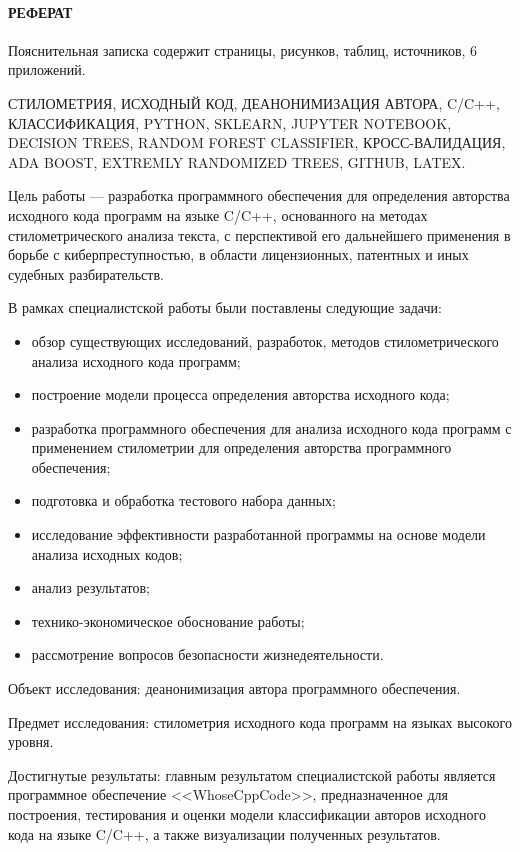 
\newpage
{}
\paragraph{\hfill РЕФЕРАТ \hfill}
Пояснительная записка содержит  страницы,  рисунков,  таблиц,  источников,
6 приложений.


СТИЛОМЕТРИЯ, ИСХОДНЫЙ КОД, ДЕАНОНИМИЗАЦИЯ АВТОРА, C/C++, КЛАССИФИКАЦИЯ, PYTHON, SKLEARN, JUPYTER NOTEBOOK, DECISION
TREES, RANDOM FOREST CLASSIFIER, КРОСС-ВАЛИДАЦИЯ, ADA BOOST, EXTREMLY RANDOMIZED TREES, GITHUB, LATEX.

Цель работы --- разработка программного обеспечения для определения авторства исходного кода программ
на языке C/C++, основанного на методах стилометрического анализа текста, с перспективой его
дальнейшего применения в борьбе с киберпреступностью, в области лицензионных, патентных и иных судебных разбирательств.

В рамках специалистской работы были поставлены следующие задачи: 
\begin{itemize}
  \item обзор существующих исследований, разработок, методов стилометрического анализа исходного кода программ;
\item построение модели процесса определения авторства исходного кода;
  \item разработка программного обеспечения для анализа исходного кода программ с применением стилометрии для
определения авторства программного обеспечения;
  \item подготовка и обработка тестового набора данных;
  \item исследование эффективности разработанной программы на основе модели анализа исходных кодов;
  \item анализ результатов;
  \item технико-экономическое обоснование работы;
  \item рассмотрение вопросов безопасности жизнедеятельности.
\end{itemize}

Объект исследования: деанонимизация автора программного обеспечения. 

Предмет исследования: стилометрия исходного кода программ на языках высокого уровня.

Достигнутые результаты: главным результатом специалистской работы является 
программное обеспечение <<WhoseCppCode>>, предназначенное для построения,
тестирования и оценки модели классификации авторов исходного кода на языке C/C++,
а также визуализации полученных результатов.

